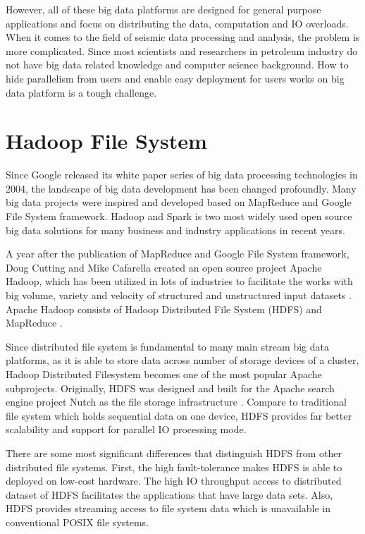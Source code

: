 However, all of these big data platforms are designed for general purpose applications and focus on distributing the data, computation and IO overloads. When it comes to the field of  seismic data processing and analysis, the problem is more complicated. Since most scientists and researchers in petroleum industry do not have big data related knowledge and computer science background. How to hide parallelism from users and enable easy deployment for users works on big data platform is a tough challenge.

\section{Hadoop File System}

Since Google released its white paper series of big data processing technologies in 2004, the landscape of big data development has been changed profoundly. Many big data projects were inspired and developed based on MapReduce and Google File System framework. Hadoop and Spark is two most widely used open source big data solutions for many business and industry applications in recent years. 

A year after the publication of MapReduce and Google File System framework, Doug Cutting and Mike Cafarella created an open source project Apache Hadoop, which has been utilized in lots of industries to facilitate the works with big volume, variety and velocity of structured and unstructured input datasets \cite{bigdatahistory}. Apache Hadoop consists of Hadoop Distributed File System (HDFS) and MapReduce \cite{ApacheHadoop}.  

Since distributed file system is fundamental to many main stream big data platforms, as it is able to store data across number of storage devices of a cluster, Hadoop Distributed Filesystem becomes one of the most popular Apache subprojects. Originally, HDFS was designed and built for the Apache search engine project Nutch as the file storage infrastructure \cite{ApacheHadoop}. Compare to traditional file system which holds sequential data on one device, HDFS provides far better scalability and support for parallel IO processing mode.

There are some most significant differences that distinguish HDFS from other distributed file systems. First, the high fault-tolerance makes HDFS is able to deployed on low-cost hardware. The high IO throughput access to distributed dataset of HDFS facilitates the applications that have large data sets. Also, HDFS provides streaming access to file system data which is unavailable in conventional POSIX file systems.  

